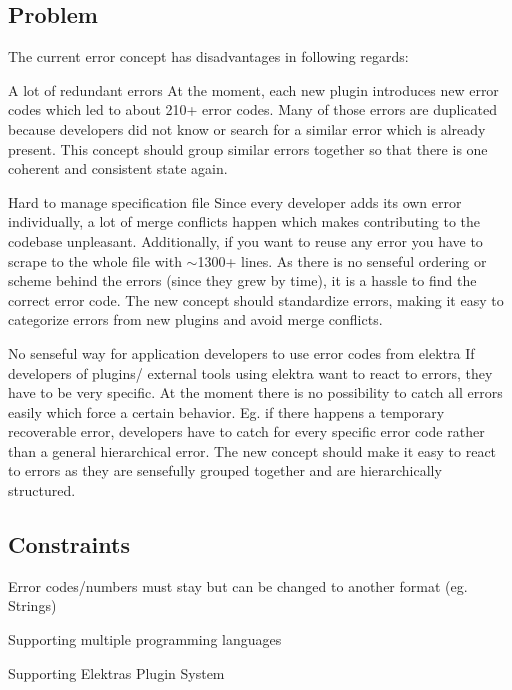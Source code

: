 \subsection*{Problem}

The current error concept has disadvantages in following regards\+:


\begin{DoxyItemize}
\item A lot of redundant errors At the moment, each new plugin introduces new error codes which led to about 210+ error codes. Many of those errors are duplicated because developers did not know or search for a similar error which is already present. This concept should group similar errors together so that there is one coherent and consistent state again.
\item Hard to manage specification file Since every developer adds its own error individually, a lot of merge conflicts happen which makes contributing to the codebase unpleasant. Additionally, if you want to reuse any error you have to scrape to the whole file with $\sim$1300+ lines. As there is no senseful ordering or scheme behind the errors (since they grew by time), it is a hassle to find the correct error code. The new concept should standardize errors, making it easy to categorize errors from new plugins and avoid merge conflicts.
\item No senseful way for application developers to use error codes from elektra If developers of plugins/ external tools using elektra want to react to errors, they have to be very specific. At the moment there is no possibility to catch all errors easily which force a certain behavior. Eg. if there happens a temporary recoverable error, developers have to catch for every specific error code rather than a general hierarchical error. The new concept should make it easy to react to errors as they are sensefully grouped together and are hierarchically structured.
\end{DoxyItemize}

\subsection*{Constraints}


\begin{DoxyItemize}
\item Error codes/numbers must stay but can be changed to another format (eg. Strings)
\item Supporting multiple programming languages
\item Supporting Elektra\textquotesingle{}s Plugin System
\end{DoxyItemize}

